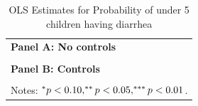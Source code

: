 \begin{table}[!ht]\centering
\caption{OLS Estimates for Probability of under 5 children having diarrhea}\label{tab:Est_OLS_diarrhea_full}
\begin{tabular}{l}
\hline \hline
\textbf{Panel A: No controls}\\[2pt]
\\[6pt]
\textbf{Panel B: Controls}\\[2pt]
\\[4pt]
\multicolumn{1}{p{0.95\linewidth}}{Notes: $\sym{*} p<0.10,\sym{**} p<0.05,\sym{***} p<0.01$.} \\
\hline
\end{tabular}
\end{table}
